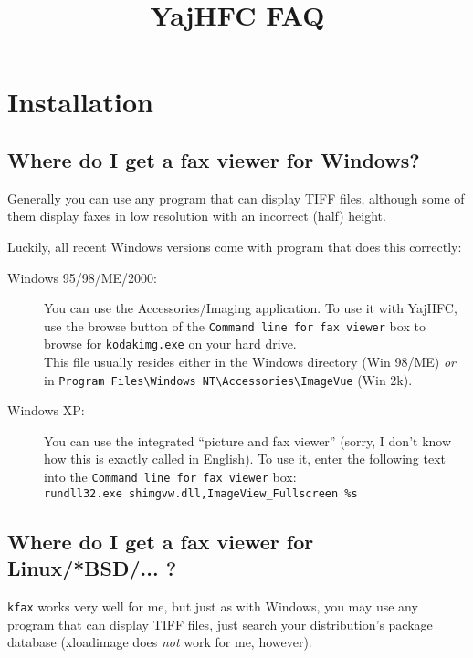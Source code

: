 \documentclass[a4paper,10pt]{scrartcl}
\title{YajHFC FAQ}
\author{}
\date{}
\begin{document}
\maketitle

\tableofcontents

\section{Installation}
\subsection{Where do I get a fax viewer for Windows?}

Generally you can use any program that can display TIFF files, although 
some of them display faxes in low resolution with an incorrect (half) height.

Luckily, all recent Windows versions come with program that does this correctly:

\begin{description}
\item[Windows 95/98/ME/2000:]
 You can use the Accessories/Imaging application.
      To use it with YajHFC, use the browse button of the \texttt{Command line for fax viewer}
      box to browse for \texttt{kodakimg.exe} on your hard drive.\\
      This file usually resides either in the Windows directory (Win 98/ME) \emph{or} \\
      in \verb.Program Files\Windows NT\Accessories\ImageVue. (Win 2k).
       
\item[Windows XP:]
You can use the integrated ``picture and fax viewer'' (sorry, I don't know
      how this is exactly called in English).
      To use it, enter the following text into the \texttt{Command line for fax viewer} box:\\
      \verb#rundll32.exe shimgvw.dll,ImageView_Fullscreen %s#
 \end{description}

      
\subsection{Where do I get a fax viewer for Linux/*BSD/... ?}
\texttt{kfax} works very well for me, but just as with Windows, you may use any program that 
can display TIFF files, just search your distribution's package database 
(xloadimage does \emph{not} work for me, however).
\end{document}
